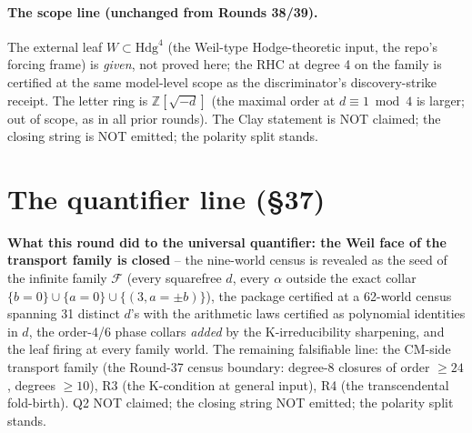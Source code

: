 \documentclass[11pt]{article}
\begin{document}
\paragraph{The scope line (unchanged from Rounds 38/39).} The external
leaf $W \subset \mathrm{Hdg}^4$ (the Weil-type Hodge-theoretic input,
the repo's forcing frame) is \emph{given}, not proved here; the RHC at
degree 4 on the family is certified at the same model-level scope as the
discriminator's discovery-strike receipt. The letter ring is
$\mathbb{Z}[\sqrt{-d}]$ (the maximal order at $d \equiv 1 \bmod 4$ is
larger; out of scope, as in all prior rounds). The Clay statement is NOT
claimed; the closing string is NOT emitted; the polarity split stands.

\section*{The quantifier line (\S37)}

\textbf{What this round did to the universal quantifier: the Weil face of
the transport family is closed} -- the nine-world census is revealed as
the seed of the infinite family $\mathcal{F}$ (every squarefree $d$, every
$\alpha$ outside the exact collar $\{b=0\} \cup \{a=0\} \cup \{(3, a =
\pm b)\}$), the package certified at a 62-world census spanning 31
distinct $d$'s with the arithmetic laws certified as polynomial
identities in $d$, the order-4/6 phase collars \emph{added} by the
K-irreducibility sharpening, and the leaf firing at every family world.
The remaining falsifiable line: the CM-side transport family (the
Round-37 census boundary: degree-8 closures of order $\geq 24$, degrees
$\geq 10$), R3 (the K-condition at general input), R4 (the transcendental
fold-birth). Q2 NOT claimed; the closing string NOT emitted; the polarity
split stands.
\end{document}
